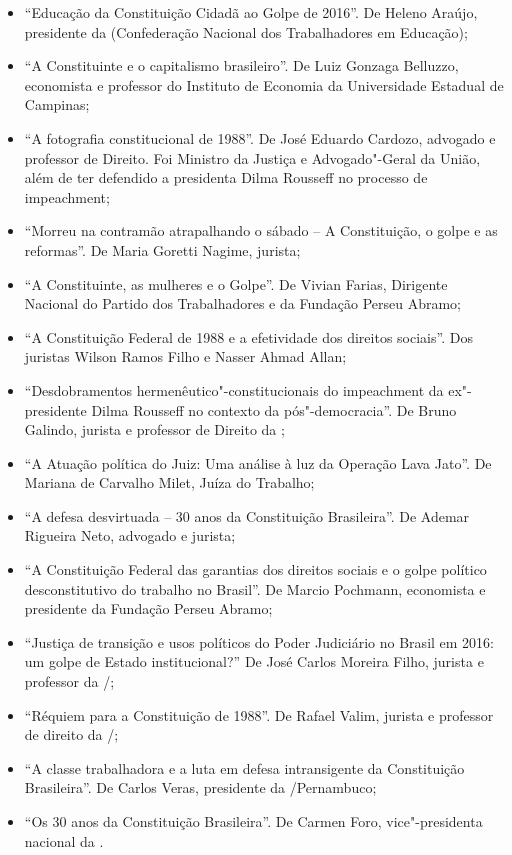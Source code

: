 \begin{itemize}
\item ``Educação da Constituição Cidadã ao Golpe de 2016''. De
Heleno Araújo, presidente da  (Confederação Nacional dos Trabalhadores em Educação);
\item ``A Constituinte e o capitalismo brasileiro''. De Luiz Gonzaga Belluzzo, economista e
professor do Instituto de Economia da Universidade Estadual de Campinas;
\item ``A fotografia constitucional de 1988''. De José
Eduardo Cardozo, advogado e professor de Direito. Foi Ministro da Justiça e Advogado"-Geral da
União, além de ter defendido a presidenta Dilma Rousseff no processo de impeachment;
\item ``Morreu na contramão atrapalhando o sábado -- A Constituição, o golpe e as
reformas''. De Maria Goretti Nagime, jurista;
\item ``A Constituinte, as mulheres e o Golpe''. De Vivian Farias, Dirigente Nacional
do Partido dos Trabalhadores e da Fundação Perseu Abramo;
\item ``A Constituição Federal de 1988 e a efetividade dos direitos sociais''. Dos
juristas Wilson Ramos Filho e Nasser Ahmad Allan;
\item ``Desdobramentos hermenêutico"-constitucionais do impeachment da ex"-presidente Dilma
Rousseff no contexto da pós"-democracia''. De Bruno Galindo, jurista e professor de Direito da
;
\item ``A Atuação política do Juiz: Uma análise à luz da Operação Lava Jato''. De Mariana
de Carvalho Milet, Juíza do Trabalho;
\item ``A defesa desvirtuada -- 30 anos da Constituição Brasileira''. De Ademar Rigueira
Neto, advogado e jurista;
\item ``A Constituição Federal das garantias dos direitos sociais e o golpe político
desconstitutivo do trabalho no Brasil''. De Marcio Pochmann, economista e presidente
da Fundação Perseu Abramo;
\item ``Justiça de transição e usos políticos do Poder Judiciário
no Brasil em 2016: um golpe de Estado institucional?'' De José Carlos Moreira Filho, jurista e
professor da /;
\item ``Réquiem para a
Constituição de 1988''. De Rafael Valim, jurista e professor de direito da /;
\item ``A classe trabalhadora e a luta em defesa
intransigente da Constituição Brasileira''. De Carlos Veras, presidente da /Pernambuco;
\item ``Os 30 anos da Constituição Brasileira''. De
Carmen Foro, vice"-presidenta nacional da .
\end{itemize}

